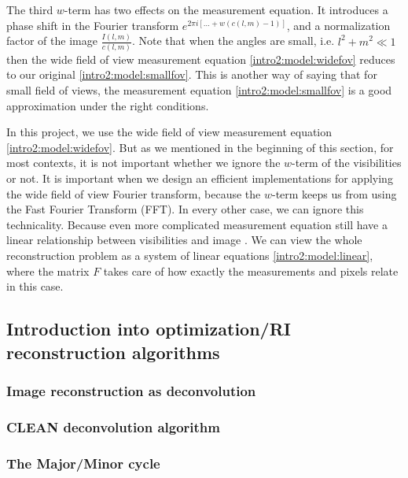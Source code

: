The third $w$-term has two effects on the measurement equation. It introduces a phase shift in the Fourier transform $e^{2 \pi i [\ldots +w(c(l, m) - 1)]}$, and a normalization factor of the image $\frac{I(l, m)}{c(l, m)}$. Note that when the angles are small, i.e. $l^2 +m^2 \ll 1$ then the wide field of view measurement equation \eqref{intro2:model:widefov} reduces to our original \eqref{intro2:model:smallfov}. This is another way of saying that for small field of views, the measurement equation \eqref{intro2:model:smallfov} is a good approximation under the right conditions. 

In this project, we use the wide field of view measurement equation \eqref{intro2:model:widefov}. But as we mentioned in the beginning of this section, for most contexts, it is not important whether we ignore the $w$-term of the visibilities or not. It is important when we design an efficient implementations for applying the wide field of view Fourier transform, because the $w$-term keeps us from using the Fast Fourier Transform (FFT). In every other case, we can ignore this technicality. Because even more complicated measurement equation still have a linear relationship between visibilities and image \cite{smirnov2011revisiting1, smirnov2011revisiting2, smirnov2011revisiting3, smirnov2011revisiting4}. We can view the whole reconstruction problem as a system of linear equations \eqref{intro2:model:linear}, where the matrix $F$ takes care of how exactly the measurements and pixels relate in this case.









\subsection{Introduction into optimization/RI reconstruction algorithms}\label{intro2:rec}


\subsubsection{Image reconstruction as deconvolution}

\subsubsection{CLEAN deconvolution algorithm}

\subsubsection{The Major/Minor cycle}\label{intro2:opt:cycle}

